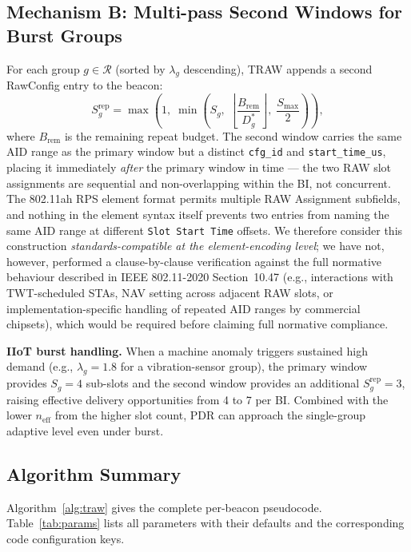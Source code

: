 \documentclass[journal]{IEEEtran}
\begin{document}
\subsection{Mechanism B: Multi-pass Second Windows for Burst Groups}
\label{sec:multipass}

For each group $g\!\in\!\mathcal{R}$ (sorted by $\lambda_g$ descending),
TRAW appends a second RawConfig entry to the beacon:
\begin{equation}
  S_g^\mathrm{rep} = \max\!\left(1,\;\min\!\left(S_g,\;
    \left\lfloor\frac{B_\mathrm{rem}}{D_g^*}\right\rfloor,\;
    \frac{S_\mathrm{max}}{2}\right)\right),
  \label{eq:srep}
\end{equation}
where $B_\mathrm{rem}$ is the remaining repeat budget.
The second window carries the same AID range as the primary window
but a distinct \texttt{cfg\_id} and \texttt{start\_time\_us}, placing it
immediately \emph{after} the primary window in time --- the two RAW
slot assignments are sequential and non-overlapping within the BI,
not concurrent.
The 802.11ah RPS element format permits multiple RAW Assignment
subfields, and nothing in the element syntax itself prevents two
entries from naming the same AID range at different
\texttt{Slot Start Time} offsets.
We therefore consider this construction \emph{standards-compatible at
the element-encoding level}; we have not, however, performed a
clause-by-clause verification against the full normative behaviour
described in IEEE 802.11-2020 Section~10.47 (e.g., interactions with
TWT-scheduled STAs, NAV setting across adjacent RAW slots, or
implementation-specific handling of repeated AID ranges by commercial
chipsets), which would be required before claiming full normative
compliance.

\textbf{IIoT burst handling.}
When a machine anomaly triggers sustained high demand (e.g.,
$\lambda_g\!=\!1.8$ for a vibration-sensor group), the primary window
provides $S_g\!=\!4$ sub-slots and the second window provides an
additional $S_g^\mathrm{rep}\!=\!3$, raising effective delivery
opportunities from 4 to 7 per BI.
Combined with the lower $n_\mathrm{eff}$ from the higher slot count,
PDR can approach the single-group adaptive level even under burst.

\subsection{Algorithm Summary}

Algorithm~\ref{alg:traw} gives the complete per-beacon pseudocode.
Table~\ref{tab:params} lists all parameters with their defaults and
the corresponding code configuration keys.
\end{document}
